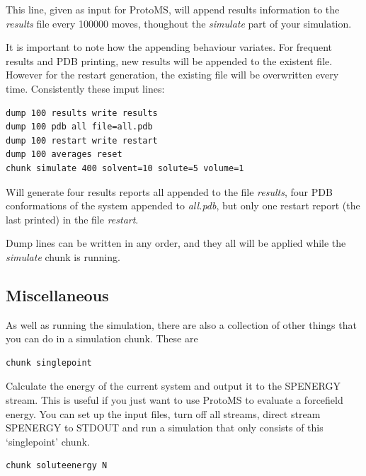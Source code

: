 \documentclass[letterpaper,10pt,english]{sphinxmanual}
\begin{document}
This line, given as input for ProtoMS, will append results information to the \emph{results} file every 100000 moves, thoughout the \emph{simulate} part of your simulation.

It is important to note how the appending behaviour variates. For frequent results and PDB printing, new results will be appended to the existent file. However for the restart generation, the existing file will be overwritten every time. Consistently these imput lines:

\begin{Verbatim}[frame=single,commandchars=\\\{\}]
dump 100 results write results
dump 100 pdb all file=all.pdb
dump 100 restart write restart
dump 100 averages reset
chunk simulate 400 solvent=10 solute=5 volume=1
\end{Verbatim}

Will generate four results reports all appended to the file \emph{results}, four PDB conformations of the system appended to \emph{all.pdb}, but only one restart report (the last printed) in the file \emph{restart}.

Dump lines can be written in any order, and they all will be applied while the \emph{simulate} chunk is running.


\subsection{Miscellaneous}
\label{protoms:miscellaneous}\label{protoms:misccmd}
As well as running the simulation, there are also a collection of other things that you can do in a simulation chunk. These are

\begin{Verbatim}[frame=single,commandchars=\\\{\}]
chunk singlepoint
\end{Verbatim}

Calculate the energy of the current system and output it to the SPENERGY stream. This is useful if you just want to use ProtoMS to evaluate a forcefield energy. You can set up the input files, turn off all streams, direct stream SPENERGY to STDOUT and run a simulation that only consists of this ‘singlepoint’ chunk.

\begin{Verbatim}[frame=single,commandchars=\\\{\}]
chunk soluteenergy N
\end{Verbatim}
\end{document}
